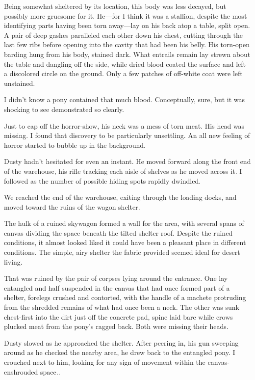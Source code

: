 Being somewhat sheltered by its location, this body was less decayed, but possibly more gruesome for it. He—for I think it was a stallion, despite the most identifying parts having been torn away—lay on his back atop a table, split open. A pair of deep gashes paralleled each other down his chest, cutting through the last few ribs before opening into the cavity that had been his belly. His torn-open barding hung from his body, stained dark. What entrails remain lay strewn about the table and dangling off the side, while dried blood coated the surface and left a discolored circle on the ground. Only a few patches of off-white coat were left unstained.

I didn’t know a pony contained that much blood. Conceptually, sure, but it was shocking to see demonstrated so clearly.

Just to cap off the horror-show, his neck was a mess of torn meat. His head was missing. I found that discovery to be particularly unsettling. An all new feeling of horror started to bubble up in the background.

Dusty hadn’t hesitated for even an instant. He moved forward along the front end of the warehouse, his rifle tracking each aisle of shelves as he moved across it. I followed as the number of possible hiding spots rapidly dwindled.

We reached the end of the warehouse, exiting through the loading docks, and moved toward the ruins of the wagon shelter.

The hulk of a ruined skywagon formed a wall for the area, with several spans of canvas dividing the space beneath the tilted shelter roof. Despite the ruined conditions, it almost looked liked it could have been a pleasant place in different conditions. The simple, airy shelter the fabric provided seemed ideal for desert living.

That was ruined by the pair of corpses lying around the entrance. One lay entangled and half suspended in the canvas that had once formed part of a shelter, forelegs crushed and contorted, with the handle of a machete protruding from the shredded remains of what had once been a neck. The other was sunk chest-first into the dirt just off the concrete pad, spine laid bare while crows plucked meat from the pony’s ragged back. Both were missing their heads.

Dusty slowed as he approached the shelter. After peering in, his gun sweeping around as he checked the nearby area, he drew back to the entangled pony. I crouched next to him, looking for any sign of movement within the canvas-enshrouded space..

